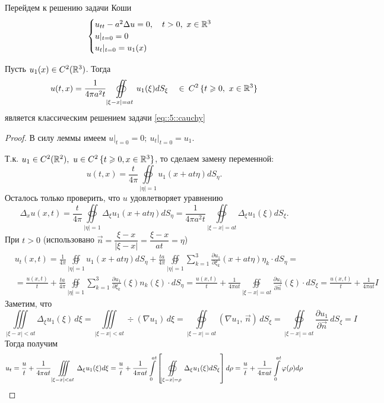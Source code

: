 \documentclass[../main.tex]{subfiles}
\begin{document}
Перейдем к решению задачи Коши
\begin{equation}
\begin{cases}
  u_{tt}-a^2\Delta u=0,\quad t>0,\ x\in \R^3\\
  u|_{t=0}=0\\
  u_t|_{t=0}=u_1(x)
\end{cases}
\label{eq::5::cauchy}
\end{equation}
\begin{theorem}
Пусть $u_1(x)\in C^2(\R^3)$. Тогда 
\[
u(t,x)=\frac{1}{4\pi a^2t} \oiint\limits_{|\xi - x|=at}u_1(\xi )dS_{\xi} \quad \in \: C^2\, \{t\geq 0,\ x\in \R^3 \}
\]
является классическим решением задачи \eqref{eq::5::cauchy}
\end{theorem}
\begin{proof}
В силу леммы имеем $\left. u\right|_{t=0}=0;\ \left. u_t\right|_{t=0}=u_1$.

Т.к. $u_1\in C^2(\R^2),\ u\in C^2\,\{t\geq 0, x\in\R^3\}$, то сделаем замену переменной:
\[
u(t, x)=\frac{t}{4\pi}\oiint\limits_{|\eta |=1}u_1(x+at\eta )dS_{\eta}.
\]
Осталось только проверить, что $u$ удовлетворяет уравнению
\[
\Delta_xu(x, t)=\frac{t}{4\pi}\oiint\limits_{|\eta |=1}\Delta_{\xi}u_1(x+at\eta )dS_{\eta}=\frac{1}{4\pi a^2t}\oiint\limits_{|\xi - x|=at}\Delta_{\xi}u_1(\xi )dS_{\xi}.
\]
При $t>0$ (использовано $\vec{n}=\dfrac{\xi - x}{|\xi - x|}=\dfrac{\xi - x}{at}=\eta$)
\begin{equation*}
\begin{split}
&u_t(x,t)=\frac{1}{4\pi}\oiint\limits_{|\eta |=1}u_1(x+at\eta )dS_{\eta}+\frac{ta}{4\pi}\oiint\limits_{|\eta |=1}\sum\limits_{k=1}^3 \frac{\partial u_1}{\partial \xi_k}(x+at\eta )\eta_k\cdot dS_{\eta}=\\[0.75em]
&=\frac{u(x, t)}{t}+\frac{ta}{4\pi}\oiint\limits_{|\eta |=1}\sum\limits_{k=1}^3 \frac{\partial u_1}{\partial \xi_k}(\xi )n_k(\xi )\cdot dS_{\eta}=\frac{u(x, t)}{t}+\frac{1}{4\pi at}\oiint\limits_{|\xi - x |=at}\frac{\partial u_1}{\partial \vec{n}}(\xi )\cdot dS_{\xi}=\frac{u(x, t)}{t} + \frac{1}{4\pi at}I
\end{split}
\end{equation*}
Заметим, что
\[
\iiint\limits_{|\xi - x|<at}\Delta_{\xi}u_1(\xi)\, d\xi =\iiint\limits_{|\xi - x|<at}\div (\nabla u_1)\, d\xi =\oiint\limits_{|\xi - x|=at} (\nabla u_1,\, \vec{n})\, dS_{\xi }=\oiint\limits_{|\xi - x|=at}\frac{\partial u_1}{\partial\vec{n}}\, dS_{\xi }=I
\]
Тогда получим 
$$
u_t=\frac{u}{t}+\frac{1}{4\pi at}\iiint\limits_{|\xi - x|<at}\Delta_{\xi}u_1(\xi )d\xi \\
= \frac{u}{t}+\frac{1}{4\pi at}\int\limits_0^{at} \left[\oiint\limits_{|\xi - x|=\rho}\Delta_{\xi}u_1(\xi )dS_{\xi}\right]d\rho \\
= \frac{u}{t}+\frac{1}{4\pi at}\int\limits_0^{at}\phi (\rho )d\rho
$$


\end{proof}
\end{document}
